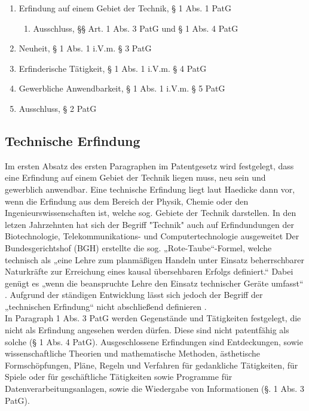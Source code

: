 \begin{enumerate}
    \item Erfindung auf einem Gebiet der Technik, § 1 Abs. 1 PatG
    \begin{enumerate}
    \vspace{-0.05in}
    \item Ausschluss, §§ Art. 1 Abs. 3 PatG und § 1 Abs. 4 PatG
    \end{enumerate}
    \vspace{-0.11in} 
    \item Neuheit, § 1 Abs. 1 i.V.m. § 3 PatG
    \vspace{-0.11in} 
    \item Erfinderische Tätigkeit, § 1 Abs. 1 i.V.m. § 4 PatG
    \vspace{-0.11in} 
    \item Gewerbliche Anwendbarkeit, § 1 Abs. 1 i.V.m. § 5 PatG
    \vspace{-0.11in} 
    \item Ausschluss, § 2 PatG
\end{enumerate}

\subsection{Technische Erfindung}

Im ersten Absatz des ersten Paragraphen im Patentgesetz wird festgelegt,
dass eine Erfindung auf einem Gebiet der Technik liegen muss, neu sein und
gewerblich anwendbar.
Eine technische Erfindung liegt laut Haedicke dann vor, 
wenn die Erfindung aus dem Bereich der Physik, 
Chemie oder den Ingenieurswissenschaften ist, 
welche sog. Gebiete der Technik darstellen.
In den letzen Jahrzehnten hat sich der Begriff 
"Technik" auch auf Erfindundungen der Biotechnologie, 
Telekommunikations- und Computertechnologie ausgeweitet 
\cite{haedickeEinfuhrung2020}
Der Bundesgerichtshof (BGH) erstellte die
sog. „Rote-Taube“-Formel, welche technisch als  
„eine Lehre zum planmäßigen Handeln 
unter Einsatz beherrschbarer Naturkräfte zur Erreichung eines 
kausal übersehbaren Erfolgs definiert.“\cite{BGH27031969}  
Dabei genügt es „wenn die beanspruchte Lehre den Einsatz technischer Geräte umfasst“
\cite{BGH3020152015}\cite{BGH2420112011a}. 
Aufgrund der ständigen Entwicklung lässt sich 
jedoch der Begriff der „technischen Erfindung“ 
nicht abschließend definieren \cite{haedickeEinfuhrung2020}.
\\
In Paragraph 1 Abs. 3 PatG werden Gegenstände und Tätigkeiten festgelegt, 
die nicht als Erfindung angesehen werden dürfen. 
Diese sind nicht patentfähig als solche (§ 1 Abs. 4 PatG). 
Ausgeschlossene Erfindungen sind Entdeckungen, 
sowie wissenschaftliche Theorien und mathematische Methoden, 
ästhetische Formschöpfungen, Pläne, Regeln und Verfahren für gedankliche Tätigkeiten, 
für Spiele 
oder für geschäftliche Tätigkeiten sowie Programme für Datenverarbeitungsanlagen, 
sowie die Wiedergabe von Informationen (§. 1 Abs. 3 PatG). 
\\

